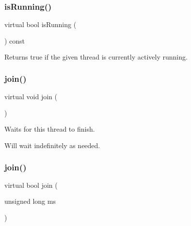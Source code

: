 \subsubsection{\texorpdfstring{is\+Running()}{isRunning()}}
{\footnotesize\ttfamily virtual bool is\+Running (\begin{DoxyParamCaption}{ }\end{DoxyParamCaption}) const\hspace{0.3cm}{\ttfamily [pure virtual]}}



Returns true if the given thread is currently actively running. 

\mbox{\label{classsgl_1_1GThread_a93870341d2cd3467df4f193375354be8}} 
\subsubsection{\texorpdfstring{join()}{join()}\hspace{0.1cm}{\footnotesize\ttfamily [1/2]}}
{\footnotesize\ttfamily virtual void join (\begin{DoxyParamCaption}{ }\end{DoxyParamCaption})\hspace{0.3cm}{\ttfamily [pure virtual]}}



Waits for this thread to finish. 

Will wait indefinitely as needed. \mbox{\label{classsgl_1_1GThread_aeaa664c96a0ace02d44fc791725550a2}} 
\subsubsection{\texorpdfstring{join()}{join()}\hspace{0.1cm}{\footnotesize\ttfamily [2/2]}}
{\footnotesize\ttfamily virtual bool join (\begin{DoxyParamCaption}\item[{unsigned long}]{ms }\end{DoxyParamCaption})\hspace{0.3cm}{\ttfamily [pure virtual]}}



